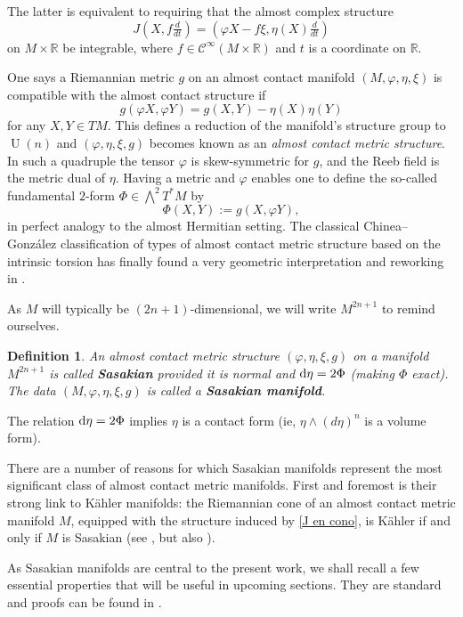 \documentclass[12pt, twoside]{amsart}
\def\D{\textup{d}}
\def\R{\mathbb{R}}
\DeclareMathOperator{\U}{\operatorname{U}}
\newtheorem{definition}{\bf Definition}[section]
\theoremstyle{definition}
\begin{document}
The latter is equivalent \cite{Sasaki} to requiring that the almost complex structure
\begin{equation}\label{J en cono}
    J\left(X, f\tfrac{d}{d t}\right)= \left(\varphi X-f\xi,\eta(X)\tfrac{d}{d t}\right)
\end{equation}
 on $M\times \R$ be integrable, where $f\in\mathcal{C}^\infty(M \times \R)$ and $t$ is a coordinate on $\R$.
\medbreak


One says a  Riemannian metric $g$ on an almost contact manifold $(M,\varphi,\eta,\xi)$ is compatible with the almost contact structure if 
    \[ g(\varphi X,\varphi Y)=g(X,Y) -\eta(X)\eta(Y)\]
    for any $X,Y\in TM$. This defines a reduction of the manifold's structure group to $\U(n)$ and $(\varphi,\eta,\xi, g)$ becomes known as an \textit{almost contact metric structure}.
In such a quadruple the tensor $\varphi$ is skew-symmetric for $g$, and the Reeb field is the metric dual of $\eta$. Having a metric and $\varphi$ enables one to define the so-called fundamental $2$-form $\Phi\in \bigwedge^2T^*M$ by 
\[\Phi(X,Y):=g(X, \varphi Y),\]
in perfect analogy to the almost Hermitian setting. The classical Chinea--Gonz{\'a}lez classification of types of almost contact metric structure based on the intrinsic torsion has finally found a very geometric interpretation and reworking in \cite{Ilka}.
\medskip

As $M$ will typically be $(2n+1)$-dimensional, we will write $M^{2n+1}$ to remind ourselves.

\begin{definition}
    An almost contact metric structure $(\varphi,\eta,\xi, g)$ on a manifold $M^{2n+1}$ is called {\bf Sasakian} provided it is normal and
$\D \eta=2\Phi$ 
(making $\Phi$ exact). The data $(M,\varphi,\eta,\xi, g)$ is called a {\bf Sasakian manifold}.
\end{definition}
The relation $\D\eta =2\Phi$ implies $\eta$ is a contact form (ie, $\eta \wedge (d\eta)^n$ is a volume form).
\medbreak

There are a number of reasons for which Sasakian manifolds represent the most significant class of almost contact metric manifolds. First and foremost is their strong link to K{\"a}hler manifolds: the Riemannian cone of an almost contact metric manifold $M$, equipped with the structure induced by \eqref{J en cono}, is K{\"a}hler if and only if $M$ is Sasakian (see \cite{Boyer}, but also \cite{Grantcharov-Ornea}).
\smallbreak

As Sasakian manifolds are central to the present work, we shall 
recall a few essential properties that will be useful in upcoming sections. They are standard and proofs can be found in \cite{Blair,Boyer-Kris-BOOK}.
\medbreak
\end{document}
